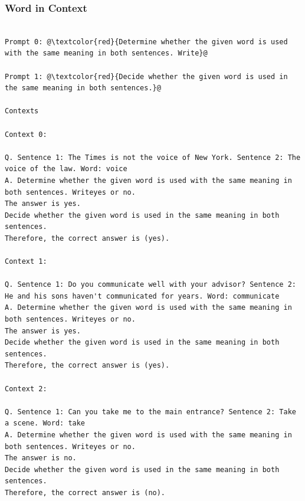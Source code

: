 \documentclass{article} %
\begin{document}
\subsubsection{Word in Context}
\begin{tcolorbox}
\begin{lstlisting}[escapechar=@]

Prompt 0: @\textcolor{red}{Determine whether the given word is used with the same meaning in both sentences. Write}@

Prompt 1: @\textcolor{red}{Decide whether the given word is used in the same meaning in both sentences.}@

Contexts

Context 0:

Q. Sentence 1: The Times is not the voice of New York. Sentence 2: The voice of the law. Word: voice
A. Determine whether the given word is used with the same meaning in both sentences. Writeyes or no.
The answer is yes.
Decide whether the given word is used in the same meaning in both sentences.
Therefore, the correct answer is (yes).

Context 1:

Q. Sentence 1: Do you communicate well with your advisor? Sentence 2: He and his sons haven't communicated for years. Word: communicate
A. Determine whether the given word is used with the same meaning in both sentences. Writeyes or no.
The answer is yes.
Decide whether the given word is used in the same meaning in both sentences.
Therefore, the correct answer is (yes).

Context 2:

Q. Sentence 1: Can you take me to the main entrance? Sentence 2: Take a scene. Word: take
A. Determine whether the given word is used with the same meaning in both sentences. Writeyes or no.
The answer is no.
Decide whether the given word is used in the same meaning in both sentences.
Therefore, the correct answer is (no).
\end{lstlisting}
\end{tcolorbox}
\end{document}
